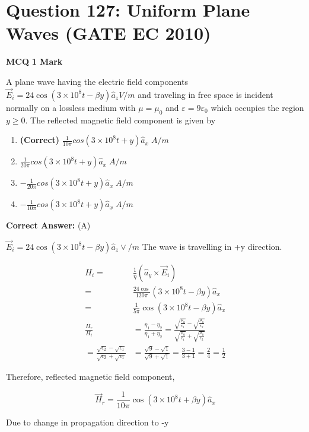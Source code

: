 \documentclass[11pt,a4paper]{article}
\begin{document}
\section*{Question 127: Uniform Plane Waves (GATE EC 2010)}
\noindent \textbf{\color{primary}MCQ} \hfill \textbf{\color{secondary}1 Mark}


\noindent A plane wave having the electric field components $\vec{E}_{i}=24 \cos (3 \times 10^{8}t-\beta y)\hat{a}_{z} V/m$ and traveling in free space is incident normally on a lossless medium with $\mu =\mu_{0}$ and $\varepsilon =9\varepsilon_{0}$ which occupies the region $y\geq 0$. The reflected magnetic field component is given by


\begin{enumerate}[label=(\Alph*)]
    \item \textbf{(Correct)} $\frac{1}{10\pi }cos(3 \times 10^{8}t+y)\hat{a}_{x} \; A/m$
    \item $\frac{1}{20\pi }cos(3 \times 10^{8}t+y)\hat{a}_{x}\; A/m$
    \item $-\frac{1}{20\pi }cos(3 \times 10^{8}t+y)\hat{a}_{x} \; A/m$
    \item $-\frac{1}{10\pi }cos(3 \times 10^{8}t+y)\hat{a}_{x} \; A/m$
\end{enumerate}

\noindent \textbf{Correct Answer:} (A)

\begin{tcolorbox}[solbox, title=Detailed Solution -- Question 127]
$\vec{E}_{i}=24 \cos \left(3 \times 10^{8} t-\beta y\right) \hat{a}_{z} \vee / m$
 The wave is travelling in +y direction.

\[
\begin{aligned} H_{i}=& \frac{1}{\eta}\left(\hat{a}_{y} \times \vec{E}_{i}\right) \\ =& \frac{24 \cos }{120 \pi}\left(3 \times 10^{8} t-\beta y\right) \hat{a}_{x} \\ =& \frac{1}{5 \pi} \cos \left(3 \times 10^{8} t-\beta y\right) \hat{a}_{x} \\ \frac{H_{r}}{H_{i}}&=\frac{\eta_{1}-\eta_{2}}{\eta_{1}+\eta_{2}}=\frac{\sqrt{\frac{\mu_{0}}{\epsilon_{1}}}-\sqrt{\frac{\mu_{0}}{\epsilon_{2}}}}{\sqrt{\frac{\mu_{0}}{\epsilon_{1}}}+\sqrt{\frac{\mu_{0}}{\epsilon_{2}}}} \\ =\frac{\sqrt{\epsilon_{2}}-\sqrt{\epsilon_{1}}}{\sqrt{\epsilon_{2}}+\sqrt{\epsilon_{1}}}&=\frac{\sqrt{9}-\sqrt{1}}{\sqrt{9}+\sqrt{1}}=\frac{3-1}{3+1}=\frac{2}{4}=\frac{1}{2} \end{aligned}
\]

Therefore, reflected magnetic field component,

\[
\vec{H}_{r}=\frac{1}{10 \pi} \cos \left(3 \times 10^{8} t+\beta y\right) \hat{a}_{x}
\]

Due to change in propagation direction to -y
\end{tcolorbox}
\end{document}
